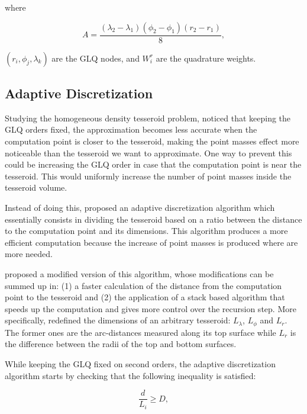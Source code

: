\documentclass[extra]{gji}
\begin{document}
\noindent where

\begin{equation}
    A =
    \frac{(\lambda_2 - \lambda_1)(\phi_2 - \phi_1)(r_2 - r_1)}{8},
\end{equation}

\noindent $(r_i, \phi_j, \lambda_k)$ are the GLQ nodes, and $W_i^r$ are
the quadrature weights.


\subsection{Adaptive Discretization}

Studying the homogeneous density tesseroid problem, \citet{Ku1977}
noticed that keeping the GLQ orders fixed, the approximation
becomes less accurate when the computation point is closer to the
tesseroid, making the point masses effect more noticeable than the
tesseroid we want to approximate.
One way to prevent this could be increasing the GLQ order in case that
the computation point is near the tesseroid.
This would uniformly increase the number of point masses inside the
tesseroid volume.

Instead of doing this, \citet{Li2011} proposed an adaptive
discretization algorithm which essentially consists in dividing the
tesseroid based on a ratio between the distance to the computation
point and its dimensions.
This algorithm produces a more efficient computation because the
increase of point masses is produced where are more needed.

\citet{Uieda2016} proposed a modified version of this algorithm, whose
modifications can be summed up in:
(1) a faster calculation of the distance from the computation point to
the tesseroid and
(2) the application of a stack based algorithm that speeds up the
computation and gives more control over the recursion step.
More specifically, \citet{Uieda2016} redefined the dimensions of an
arbitrary tesseroid: $L_\lambda$, $L_\phi$ and $L_r$. The former ones
are the arc-distances measured along its top surface while $L_r$ is the
difference between the radii of the top and bottom surfaces.

While keeping the GLQ fixed on second orders, the adaptive
discretization algorithm starts by checking that the following
inequality is satisfied:

\begin{equation}
    \frac{d}{L_i} \geq D,
\label{eq:distance-size-ratio}
\end{equation}
\end{document}
